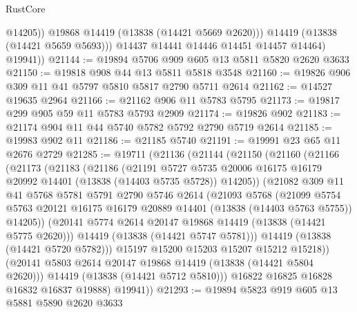 \begin{lexlean}{RustCore}
\begin{coremodule}
                  @14205))
              @19868
              @14419
              (@13838 (@14421 @5669 @2620)))
            @14419
            (@13838 (@14421 @5659 @5693)))
          @14437
          @14441
          @14446
          @14451
          @14457
          @14464)
        @19941))
@21144 := @19894 @5706 @909 @605 @13 @5811 @5820 @2620 @3633
@21150 := @19818 @908 @44 @13 @5811 @5818 @3548
@21160 := @19826 @906 @309 @11 @41 @5797 @5810 @5817 @2790 @5711 @2614
@21162 := @14527 @19635 @2964
@21166 := @21162 @906 @11 @5783 @5795
@21173 := @19817 @299 @905 @59 @11 @5783 @5793 @2909
@21174 := @19826 @902
@21183 := @21174 @904 @11 @44 @5740 @5782 @5792 @2790 @5719 @2614
@21185 := @19983 @902 @11
@21186 := @21185 @5740
@21191 := @19991 @23 @65 @11 @2676 @2729
@21285 := @19711
    (@21136
      (@21144
        (@21150
          (@21160
            (@21166
              (@21173
                (@21183
                  (@21186
                    (@21191
                      @5727
                      @5735
                      @20006
                      @16175
                      @16179
                      @20992
                      @14401
                      (@13838 (@14403 @5735 @5728))
                      @14205))
                  (@21082
                    @309
                    @11
                    @41
                    @5768
                    @5781
                    @5791
                    @2790
                    @5746
                    @2614
                    (@21093
                      @5768
                      (@21099
                        @5754
                        @5763
                        @20121
                        @16175
                        @16179
                        @20889
                        @14401
                        (@13838 (@14403 @5763 @5755))
                        @14205))
                    (@20141 @5774 @2614 @20147 @19868 @14419 (@13838 (@14421 @5775 @2620)))
                    @14419
                    (@13838 (@14421 @5747 @5781)))
                  @14419
                  (@13838 (@14421 @5720 @5782)))
                @15197
                @15200
                @15203
                @15207
                @15212
                @15218))
            (@20141 @5803 @2614 @20147 @19868 @14419 (@13838 (@14421 @5804 @2620)))
            @14419
            (@13838 (@14421 @5712 @5810)))
          @16822
          @16825
          @16828
          @16832
          @16837
          @19888)
        @19941))
@21293 := @19894 @5823 @919 @605 @13 @5881 @5890 @2620 @3633

\end{coremodule}
\end{lexlean}
